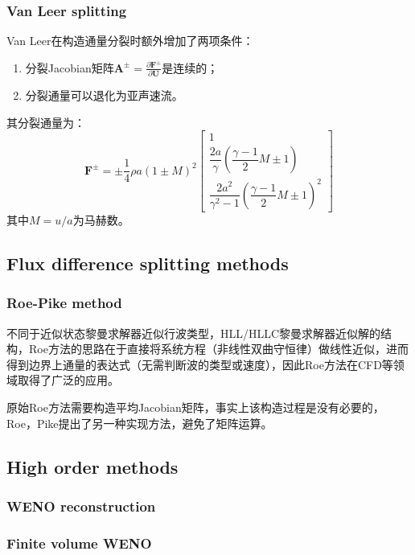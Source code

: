 \documentclass[11pt]{article}
\begin{document}
\subsubsection{Van Leer splitting}
Van Leer在构造通量分裂时额外增加了两项条件：
\begin{enumerate}[label=(\arabic*)]
	\item 分裂Jacobian矩阵$\bm{A}^\pm=\frac{\partial\bm{F}^\pm}{\partial\bm{U}}$是连续的；
	\item 分裂通量可以退化为亚声速流。
\end{enumerate}
其分裂通量为：
\begin{equation}
	\bm{F}^\pm=\pm\dfrac{1}{4}\rho a(1\pm M)^2\left[\begin{matrix}
			1                                                        \\
			\dfrac{2a}{\gamma}\left(\dfrac{\gamma-1}{2}M\pm 1\right) \\
			\dfrac{2a^2}{\gamma^2-1}\left(\dfrac{\gamma-1}{2}M\pm 1\right)^2
		\end{matrix}\right]
\end{equation}
其中$M=u/a$为马赫数。

\subsection{Flux difference splitting methods}
\subsubsection{Roe-Pike method}
不同于近似状态黎曼求解器近似行波类型，HLL/HLLC黎曼求解器近似解的结构，Roe方法的思路在于直接将系统方程（非线性双曲守恒律）做线性近似，进而得到边界上通量的表达式（无需判断波的类型或速度），因此Roe方法在CFD等领域取得了广泛的应用。

原始Roe方法需要构造平均Jacobian矩阵，事实上该构造过程是没有必要的，Roe，Pike提出了另一种实现方法，避免了矩阵运算。

\subsection{High order methods}
\subsubsection{WENO reconstruction}

\subsubsection{Finite volume WENO}
\end{document}
